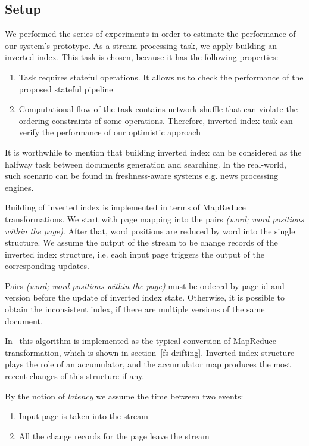 
\label{fs-experiments-section}

\subsection{Setup}
We performed the series of experiments in order to estimate the performance of our system's prototype. As a stream processing task, we apply building an inverted index. This task is chosen, because it has the following properties:

\begin{enumerate}
    \item Task requires stateful operations. It allows us to check the performance of the proposed stateful pipeline
    \item Computational flow of the task contains network shuffle that can violate the ordering constraints of some operations. Therefore, inverted index task can verify the performance of our optimistic approach
\end{enumerate}

It is worthwhile to mention that building inverted index can be considered as the halfway task between documents generation and searching. In the real-world, such scenario can be found in freshness-aware systems e.g. news processing engines.

Building of inverted index is implemented in terms of MapReduce transformations. We start with page mapping into the pairs {\it (word; word positions within the page)}. After that, word positions are reduced by word into the single structure. We assume the output of the stream to be change records of the inverted index structure, i.e. each input page triggers the output of the corresponding updates. 

Pairs {\it (word; word positions within the page)} must be ordered by page id and version before the update of inverted index state. Otherwise, it is possible to obtain the inconsistent index, if there are multiple versions of the same document.  
 
In \FlameStream\ this algorithm is implemented as the typical conversion of MapReduce transformation, which is shown in section~\ref{fs-drifting}. Inverted index structure plays the role of an accumulator, and the accumulator map produces the most recent changes of this structure if any.

By the notion of {\it latency} we assume the time between two events: 
\begin{enumerate}
    \item Input page is taken into the stream
    \item All the change records for the page leave the stream
\end{enumerate}


